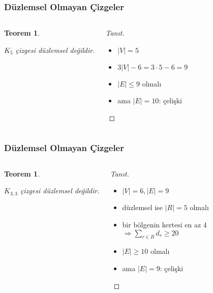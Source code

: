 \documentclass[dvipsnames]{beamer}
\theoremstyle{definition}
\theoremstyle{example}
\theoremstyle{plain}
\newtheorem{teorem}[theorem]{Teorem}
\begin{document}
\begin{frame}
  \frametitle{Düzlemsel Olmayan Çizgeler}

  \begin{columns}
    \begin{teorem}
      \begin{center}
      \end{center}

      $K_5$ çizgesi düzlemsel değildir.
    \end{teorem}

    \pause
    \begin{proof}[Tanıt]
      \begin{itemize}
        \item $|V| = 5$

        \pause
        \item $3 |V| - 6 = 3 \cdot 5 - 6 = 9$

        \pause
        \item $|E| \leq 9$ olmalı\\

        \pause
        \item ama $|E| = 10$: \alert{çelişki}
      \end{itemize}
    \end{proof}
  \end{columns}
\end{frame}

\begin{frame}
  \frametitle{Düzlemsel Olmayan Çizgeler}

  \begin{columns}
    \begin{teorem}
      \begin{center}
      \end{center}

      $K_{3,3}$ çizgesi düzlemsel değildir.
    \end{teorem}

    \pause
    \begin{proof}[Tanıt]
      \begin{itemize}
        \item $|V| = 6, |E| = 9$

        \pause
        \item düzlemsel ise $|R| = 5$ olmalı

        \pause
        \item bir bölgenin kertesi en az $4$\\
          $\Rightarrow \sum_{r \in R} d_r \geq 20$

        \pause
        \item $|E| \geq 10$ olmalı\\

        \pause
        \item ama $|E| = 9$: \alert{çelişki}
      \end{itemize}
    \end{proof}
  \end{columns}
\end{frame}
\end{document}
